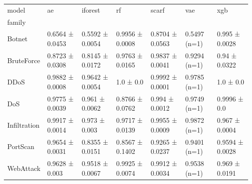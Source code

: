 \begin{tabular}{lllllll}
\toprule
model & ae & iforest & rf & scarf & vae & xgb \\
family &  &  &  &  &  &  \\
\midrule
Botnet & 0.6564 ± 0.0453 & 0.5592 ± 0.0054 & 0.9956 ± 0.0008 & 0.8704 ± 0.0563 & 0.5497 (n=1) & 0.995 ± 0.0028 \\
BruteForce & 0.8723 ± 0.0308 & 0.8145 ± 0.0172 & 0.9763 ± 0.0165 & 0.9837 ± 0.0041 & 0.9294 (n=1) & 0.94 ± 0.0322 \\
DDoS & 0.9882 ± 0.0008 & 0.9642 ± 0.0054 & 1.0 ± 0.0 & 0.9992 ± 0.0001 & 0.9785 (n=1) & 1.0 ± 0.0 \\
DoS & 0.9775 ± 0.0039 & 0.961 ± 0.0062 & 0.8766 ± 0.0762 & 0.994 ± 0.0012 & 0.9749 (n=1) & 0.9996 ± 0.0 \\
Infiltration & 0.9917 ± 0.0014 & 0.973 ± 0.003 & 0.9717 ± 0.0139 & 0.9955 ± 0.0009 & 0.9872 (n=1) & 0.967 ± 0.0004 \\
PortScan & 0.9654 ± 0.0031 & 0.8355 ± 0.0151 & 0.8567 ± 0.1402 & 0.9265 ± 0.0237 & 0.9401 (n=1) & 0.9594 ± 0.0028 \\
WebAttack & 0.9628 ± 0.003 & 0.9518 ± 0.0067 & 0.9925 ± 0.0074 & 0.9912 ± 0.0034 & 0.9538 (n=1) & 0.969 ± 0.0191 \\
\bottomrule
\end{tabular}
